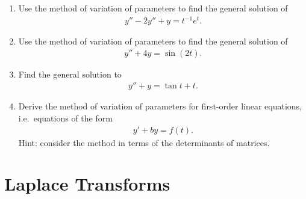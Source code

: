 \documentclass{book}
\begin{document}
\begin{enumerate}

\item Use the method of variation of parameters to find the general solution of
  \begin{align*}
  y'' - 2 y'' + y = t^{-1} e^t.
  \end{align*}

\item Use the method of variation of parameters to find the general solution of
  \begin{align*}
  y'' + 4y = \sin(2t).
  \end{align*}

\item
  Find the general solution to
  \begin{align*}
  y'' + y = \tan t + t.
  \end{align*}

\item
  Derive the method of variation of parameters for first-order linear
  equations, i.e.\ equations of the form
  \begin{align*}
  y' + by = f(t).
  \end{align*}
  Hint: consider the method in terms of the determinants of matrices.

\end{enumerate}


\chapter{Laplace Transforms}
\end{document}
